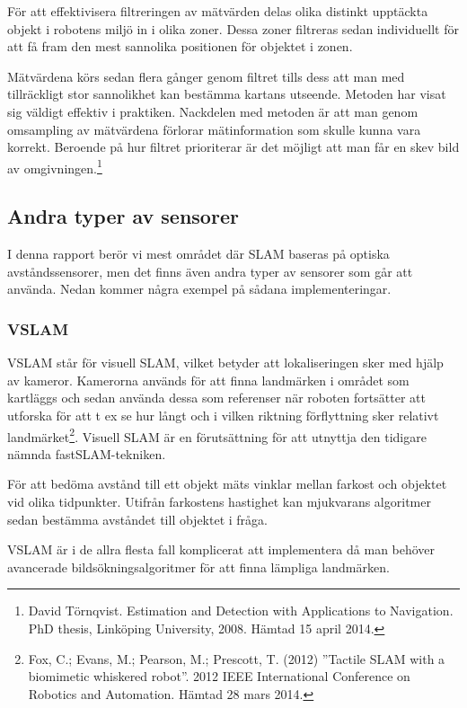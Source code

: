 \documentclass[a4paper,12pt,fleqn]{article}
\begin{document}
För att effektivisera filtreringen av mätvärden delas olika distinkt upptäckta objekt i robotens miljö in i olika zoner. Dessa zoner filtreras sedan individuellt för att få fram den mest sannolika positionen för objektet i zonen. 

Mätvärdena körs sedan flera gånger genom filtret tills dess att man med tillräckligt stor sannolikhet kan bestämma kartans utseende. Metoden har visat sig väldigt effektiv i praktiken. Nackdelen med metoden är att man genom omsampling av mätvärdena förlorar mätinformation som skulle kunna vara korrekt. Beroende på hur filtret prioriterar är det möjligt att man får en skev bild av omgivningen.\footnote{David Törnqvist. Estimation and Detection with Applications to Navigation. PhD thesis, Linköping University, 2008. Hämtad 15 april 2014.}

\subsection{Andra typer av sensorer}

I denna rapport berör vi mest området där SLAM baseras på optiska avståndssensorer, men det finns även andra typer av sensorer som går att använda. Nedan kommer några exempel på sådana implementeringar.

\subsubsection{VSLAM}

VSLAM står för visuell SLAM, vilket betyder att lokaliseringen sker med hjälp av kameror. Kamerorna används för att finna landmärken i området som kartläggs och sedan använda dessa som referenser när roboten fortsätter att utforska för att t ex se hur långt och i vilken riktning förflyttning sker relativt landmärket\footnote{Fox, C.; Evans, M.; Pearson, M.; Prescott, T. (2012) ''Tactile SLAM with a biomimetic whiskered robot''. 2012 IEEE International Conference on Robotics and Automation. Hämtad 28 mars 2014.}. Visuell SLAM är en förutsättning för att utnyttja den tidigare nämnda fastSLAM-tekniken. 

För att bedöma avstånd till ett objekt mäts vinklar mellan farkost och objektet vid olika tidpunkter. Utifrån farkostens hastighet kan mjukvarans algoritmer sedan bestämma avståndet till objektet i fråga. 

VSLAM är i de allra flesta fall komplicerat att implementera då man behöver avancerade bildsökningsalgoritmer för att finna lämpliga landmärken. 
\end{document}
